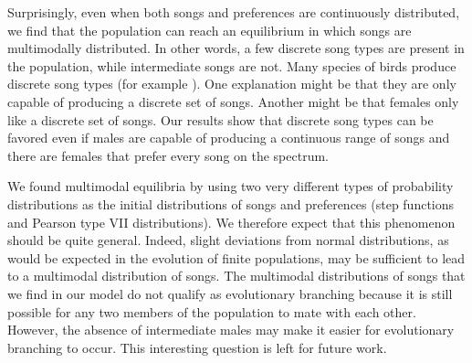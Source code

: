 \documentclass[12pt]{article}
\begin{document}
Surprisingly, even when both songs and preferences are continuously distributed, we find that the population can reach an equilibrium in which songs are multimodally distributed. In other words, a few discrete song types are present in the population, while intermediate songs are not. Many species of birds produce discrete song types (for example \cite{Gibbs:1990fk,Devoogd:1993uq}). One explanation might be that they are only capable of producing a discrete set of songs. Another might be that females only like a discrete set of songs. Our results show that discrete song types can be favored even if males are capable of producing a continuous range of songs and there are females that prefer every song on the spectrum.

We found multimodal equilibria by using two very different types of probability distributions as the initial distributions of songs and preferences (step functions and Pearson type VII distributions). We therefore expect that this phenomenon should be quite general. Indeed, slight deviations from normal distributions, as would be expected in the evolution of finite populations, may be sufficient to lead to a multimodal distribution of songs. The multimodal distributions of songs that we find in our model do not qualify as evolutionary branching because it is still possible for any two members of the population to mate with each other. However, the absence of intermediate males may make it easier for evolutionary branching to occur. This interesting question is left for future work. 
 
 
\end{document}

